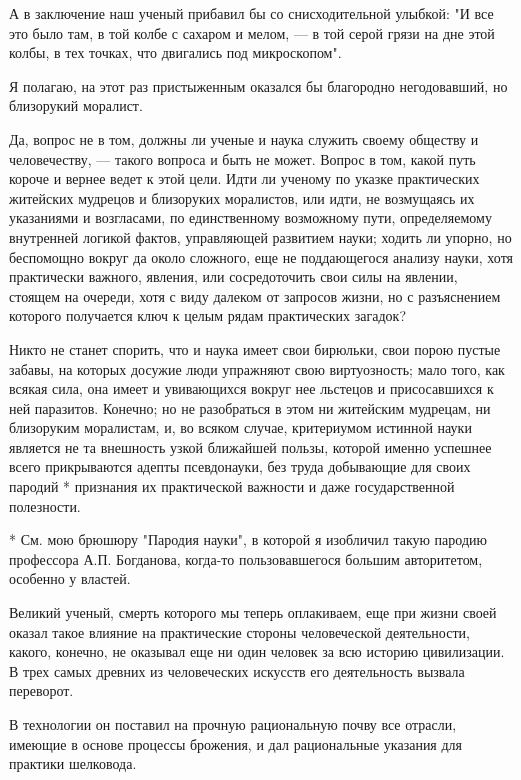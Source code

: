 А в заключение наш ученый прибавил бы со снисходительной улыбкой: "И все
это было там, в той колбе с сахаром и мелом, --- в той серой грязи на  дне
этой колбы, в тех точках, что двигались под микроскопом".

Я полагаю, на этот раз пристыженным оказался бы благородно негодовавший,
но близорукий моралист.

Да, вопрос не в том, должны ли ученые и наука служить своему обществу  и
человечеству, --- такого вопроса и быть не может. Вопрос в том, какой путь
короче  и  вернее  ведет  к  этой  цели.  Идти  ли  ученому  по   указке
практических житейских мудрецов  и близоруких моралистов,  или идти,  не
возмущаясь их указаниями и возгласами, по единственному возможному пути,
определяемому внутренней  логикой фактов,  управляющей развитием  науки;
ходить ли  упорно,  но  беспомощно  вокруг да  около  сложного,  еще  не
поддающегося анализу  науки,  хотя  практически  важного,  явления,  или
сосредоточить свои  силы на  явлении, стоящем  на очереди,  хотя с  виду
далеком от запросов жизни, но с разъяснением которого получается ключ  к
целым рядам практических загадок?

Никто не станет  спорить, что и  наука имеет свои  бирюльки, свои  порою
пустые забавы, на которых досужие люди упражняют свою виртуозность; мало
того, как всякая  сила, она имеет  и увивающихся вокруг  нее льстецов  и
присосавшихся к  ней паразитов.  Конечно; но  не разобраться  в этом  ни
житейским мудрецам,  ни  близоруким  моралистам, и,  во  всяком  случае,
критериумом истинной  науки является  не  та внешность  узкой  ближайшей
пользы, которой именно успешнее  всего прикрываются адепты  псевдонауки,
без труда  добывающие  для своих  пародий  * признания  их  практической
важности и даже государственной полезности.

* См. мою брюшюру "Пародия науки", в которой я изобличил такую пародию
профессора А.П. Богданова, когда-то пользовавшегося большим
авторитетом, особенно у властей.

Великий ученый,  смерть которого  мы теперь  оплакиваем, еще  при  жизни
своей  оказал  такое  влияние   на  практические  стороны   человеческой
деятельности, какого, конечно, не  оказывал еще ни  один человек за  всю
историю цивилизации. В трех самых  древних из человеческих искусств  его
деятельность вызвала переворот.

В технологии  он поставил  на прочную  рациональную почву  все  отрасли,
имеющие в  основе процессы  брожения, и  дал рациональные  указания  для
практики шелковода.

